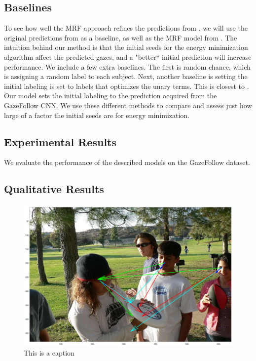 \documentclass[10pt,twocolumn,letterpaper]{article}
\begin{document}
\subsection{Baselines}

To see how well the MRF approach refines the predictions from \cite{nips15_recasens}, we will use the original predictions from \cite{nips15_recasens} as a baseline, as well as the MRF model from \cite{fathi2012social}. The intuition behind our method is that the initial seeds for the energy minimization algorithm affect the predicted gazes, and a "better`` initial prediction will increase performance. We include a few extra baselines. The first is random chance, which is assigning a random label to each subject. Next, another baseline is setting the initial labeling is set to labels that optimizes the unary terms. This is closest to \cite{fathi2012social}. Our model sets the initial labeling to the prediction acquired from the GazeFollow CNN. We use these different methods to compare and assess just how large of a factor the initial seeds are for energy minimization.

\subsection{Experimental Results}

We evaluate the performance of the described models on the GazeFollow \cite{nips15_recasens} dataset.


\subsection{Qualitative Results}

\begin{figure}[t]
  \begin{center}
    \includegraphics[width=0.95\linewidth]{images/fail1.png}
  \end{center}
  \vspace{-0.3cm}
   \caption{This is a caption}
  \vspace{-0.5cm}
\end{figure}

{\small


}
\end{document}
